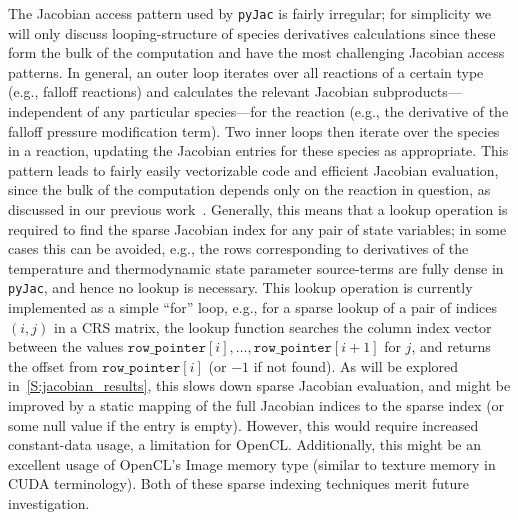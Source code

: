 \documentclass[12pt,number,sort&compress,preprint]{elsarticle}
\begin{document}
The Jacobian access pattern used by \texttt{pyJac} is fairly irregular; for simplicity we will only discuss looping-structure of species derivatives calculations since these form the bulk of the computation and have the most challenging Jacobian access patterns.
In general, an outer loop iterates over all reactions of a certain type (e.g., falloff reactions) and calculates the relevant Jacobian subproducts---independent of any particular species---for the reaction (e.g., the derivative of the falloff pressure modification term).
Two inner loops then iterate over the species in a reaction, updating the Jacobian entries for these species as appropriate.
This pattern leads to fairly easily vectorizable code and efficient Jacobian evaluation, since the bulk of the computation depends only on the reaction in question, as discussed in our previous work~\cite{Niemeyer:2016aa}.
Generally, this means that a lookup operation is required to find the sparse Jacobian index for any pair of state variables; in some cases this can be avoided, e.g., the rows corresponding to derivatives of the temperature and thermodynamic state parameter source-terms are fully dense in \texttt{pyJac}, and hence no lookup is necessary.
This lookup operation is currently implemented as a simple ``for'' loop, e.g., for a sparse lookup of a pair of indices $(i, j)$ in a CRS matrix, the lookup function searches the column index vector between the values $\texttt{row\_pointer}[i], \ldots, \texttt{row\_pointer}[i + 1]$ for $j$, and returns the offset from $\texttt{row\_pointer}[i]$ (or $\num{-1}$ if not found).
As will be explored in~\cref{S:jacobian_results}, this slows down sparse Jacobian evaluation, and might be improved by a static mapping of the full Jacobian indices to the sparse index (or some null value if the entry is empty).
However, this would require increased constant-data usage, a limitation for OpenCL.
Additionally, this might be an excellent usage of OpenCL's Image memory type (similar to texture memory in CUDA terminology).
Both of these sparse indexing techniques merit future investigation.
\end{document}
